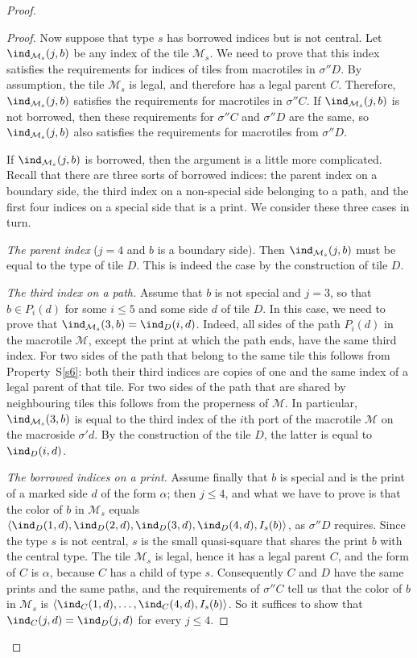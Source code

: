 \documentclass[12pt]{article}
\theoremstyle{remark}
\newcommand{\pair}[1]{\langle #1\rangle}
\begin{document}
\begin{proof}
\begin{proof}
Now suppose that type $s$ has borrowed indices but is not central. Let $\ind_{\mathcal M_s}(j,b)$ be any index of the tile $\mathcal M_s$.
We need to prove that this index satisfies the requirements for indices
of tiles from macrotiles in $\sigma'' D$.
By assumption, the tile $\mathcal M_s$ is legal, and therefore
has a legal parent $C$. Therefore, $\ind_{\mathcal M_s}(j,b)$
satisfies the requirements for macrotiles in $\sigma'' C$. If
$\ind_{\mathcal M_s}(j,b)$ is not borrowed, then these requirements for
$\sigma'' C$ and $\sigma'' D$ are the same, so $\ind_{\mathcal M_s}(j,b)$
also satisfies the requirements for macrotiles from $\sigma'' D$.

If
$\ind_{\mathcal M_s}(j,b)$ is borrowed, then the argument is a little more complicated.
Recall that there are three sorts of borrowed indices: the parent index on a boundary side, the
third index on a non-special side belonging to a path, and the first four indices on a special
side that is a print. We consider these three cases in turn.

\emph{The parent index} ($j=4$ and $b$ is a boundary side). Then $\ind_{\mathcal M_s}(j,b)$
must be equal to the type of tile $D$. This is indeed the case
by the construction of tile $D$.

\emph{The third index on a path.} Assume that $b$ is not special and $j=3$, so that
$b\in P_i(d)$ for some $i\le5$ and some side $d$ of tile $D$.
In this case, we need to prove that $\ind_{\mathcal M_s}(3,b)=\ind_D(i,d)$.
Indeed, all sides of the path $P_i(d)$ in the macrotile $\mathcal M$, except the print at which
the path ends, have the same third index. For two sides of the path that belong to the same tile
this follows from Property~S\ref{s6}: both their third indices are copies of one and the same
index of a legal parent of that tile. For two sides of the path that are shared by neighbouring
tiles this follows from the properness of $\mathcal M$.
In particular, $\ind_{\mathcal M_s}(3,b)$ is  equal to the third index of the $i$th port of the macrotile $\mathcal M$
on the macroside
$\sigma' d$. By the construction of the tile $D$, the latter is equal to $\ind_D(i,d)$.

\emph{The borrowed indices on a print.} Assume finally that $b$ is special and is the print of a
marked side $d$ of the form $\alpha$; then $j\le 4$, and what we have to prove is that the color
of $b$ in $\mathcal M_s$ equals
$\pair{\ind_D(1,d),\ind_D(2,d),\ind_D(3,d),\ind_D(4,d),I_s(b)}$, as $\sigma''D$ requires. Since
the type $s$ is not central, $s$ is the small quasi-square that shares the print $b$ with the
central type. The tile $\mathcal M_s$ is legal, hence it has a legal parent $C$, and the form of
$C$ is $\alpha$, because $C$ has a child of type $s$. Consequently $C$ and $D$ have the same
prints and the same paths, and the requirements of $\sigma''C$ tell us that the color of $b$ in
$\mathcal M_s$ is $\pair{\ind_C(1,d),\dots,\ind_C(4,d),I_s(b)}$. So it suffices to show that
$\ind_C(j,d)=\ind_D(j,d)$ for every $j\le4$.


\end{proof}
\end{proof}
\end{document}
